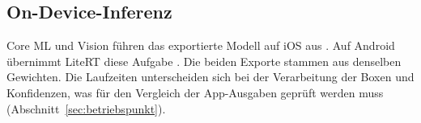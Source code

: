 \subsection{On-Device-Inferenz}\label{sec:ondevice}

Core ML und Vision führen das exportierte Modell auf iOS aus
\cite{apple2025coreml,apple2025vision}. Auf Android übernimmt LiteRT diese
Aufgabe \cite{google2026litert}. Die beiden Exporte stammen aus denselben Gewichten. Die
Laufzeiten unterscheiden sich bei der Verarbeitung der Boxen und
Konfidenzen, was für den Vergleich der App-Ausgaben geprüft werden muss
(Abschnitt~\ref{sec:betriebspunkt}).
